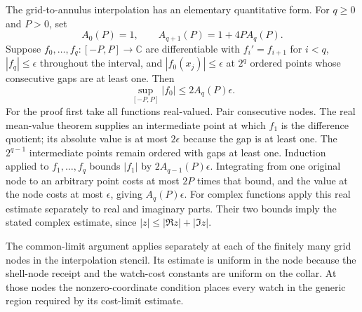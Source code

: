 The grid-to-annulus interpolation has an elementary quantitative form.  For
$q\geq0$ and $P>0$, set
\[
 A_0(P)=1,\qquad A_{q+1}(P)=1+4P A_q(P).
\]
Suppose $f_0,\ldots,f_q:[-P,P]\to\mathbb C$ are differentiable with
$f_i'=f_{i+1}$ for $i<q$, $|f_q|\leq\epsilon$ throughout the interval,
and $|f_0(x_j)|\leq\epsilon$ at $2^q$ ordered points whose consecutive
gaps are at least one.  Then
\begin{equation}\label{eq:ex-lattice-annulus-interpolation}
 \sup_{[-P,P]}|f_0|\leq2A_q(P)\epsilon.
\end{equation}
For the proof first take all functions real-valued.  Pair consecutive
nodes.  The real mean-value theorem supplies an intermediate point at which
$f_1$ is the difference quotient; its absolute value is at most
$2\epsilon$ because the gap is at least one.  The $2^{q-1}$ intermediate
points remain ordered with gaps at least one.  Induction applied to
$f_1,\ldots,f_q$ bounds $|f_1|$ by $2A_{q-1}(P)\epsilon$.  Integrating from
one original node to an arbitrary point costs at most $2P$ times that bound,
and the value at the node costs at most $\epsilon$, giving
$A_q(P)\epsilon$.  For complex functions apply this real estimate
separately to real and imaginary parts.  Their two bounds imply the stated
complex estimate, since $|z|\leq|\Re z|+|\Im z|$.

The common-limit argument applies separately at each of the finitely many
grid nodes in the interpolation stencil.  Its estimate is uniform in the
node because the shell-node receipt and the watch-cost constants are uniform on
the collar.  At those nodes the nonzero-coordinate condition places every
watch in the generic region required by its cost-limit estimate.

